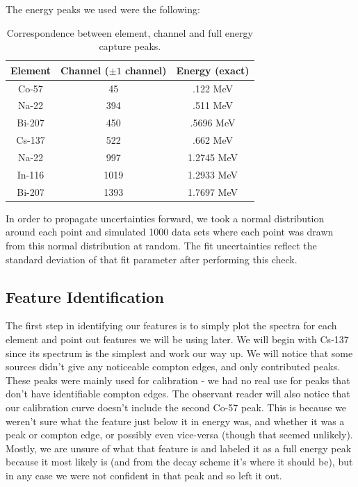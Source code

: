 \documentclass[reprint, nobibnotes, amssymb, amsmath, amsfonts, physics, mathtools, mathrsfs, floatfix]{revtex4-1}
\begin{document}
      The energy peaks we used were the following:

      \begin{table}[h]
        \centering
        \begin{tabular}{|c|c|c|}
          \hline
          Element & Channel ($\pm1$ channel) & Energy (exact) \\ \hline
          Co-57 & 45 & .122 MeV \\ \hline
          Na-22 & 394 & .511 MeV \\ \hline
          Bi-207 & 450 & .5696 MeV \\ \hline
          Cs-137 & 522 & .662 MeV \\ \hline
          Na-22 & 997 & 1.2745 MeV \\ \hline
          In-116 & 1019 & 1.2933 MeV \\ \hline
          Bi-207 & 1393 & 1.7697 MeV \\ \hline
        \end{tabular}
        \caption{Correspondence between element, channel and full energy capture peaks. \label{tab:calibration_points}}
      \end{table}

      In order to propagate uncertainties forward, we took a normal distribution around each point and simulated 1000 data sets where each point was drawn from this normal distribution at random.  The fit uncertainties reflect the standard deviation of that fit parameter after performing this check.

    \subsection{Feature Identification}
      The first step in identifying our features is to simply plot the spectra for each element and point out features we will be using later.  We will begin with Cs-137 since its spectrum is the simplest and work our way up.  We will notice that some sources didn't give any noticeable compton edges, and only contributed peaks.  These peaks were mainly used for calibration - we had no real use for peaks that don't have identifiable compton edges.  The observant reader will also notice that our calibration curve doesn't include the second Co-57 peak.  This is because we weren't sure what the feature just below it in energy was, and whether it was a peak or compton edge, or possibly even vice-versa (though that seemed unlikely).  Mostly, we are unsure of what that feature is and labeled it as a full energy peak because it most likely is (and from the decay scheme it's where it should be), but in any case we were not confident in that peak and so left it out.
\end{document}
